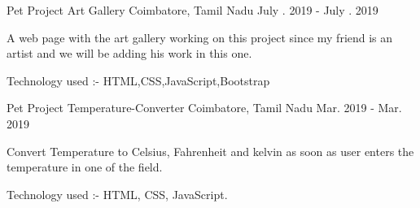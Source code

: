 \begin{cventries}
\cventry
    {Pet Project} %
    {{Art Gallery}} %
    {Coimbatore, Tamil Nadu} %
    {July . 2019 - July . 2019} %
    {
      \begin{cvitems} %
        \item {A web page with the art gallery working on this project since my friend is an artist and we will be adding \newline his work in this one.}
        \item {Technology used :- HTML,CSS,JavaScript,Bootstrap}
      \end{cvitems}
    }
\cventry
    {Pet Project} %
    {{Temperature-Converter}} %
    {Coimbatore, Tamil Nadu} %
    {Mar. 2019 - Mar. 2019} %
    {
      \begin{cvitems} %
        \item {Convert Temperature to Celsius, Fahrenheit and kelvin as soon as user enters the temperature in one of the field.}
        \item {Technology used :- HTML, CSS, JavaScript.}
      \end{cvitems}
    }

\end{cventries}






